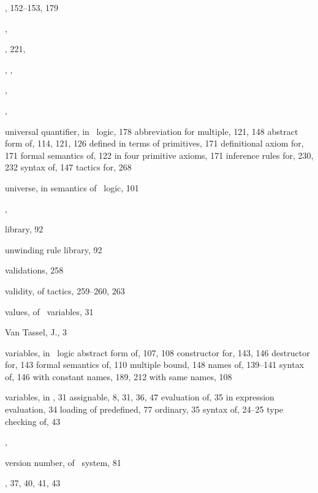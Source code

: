 \begin{theindex}
  \item {}, 152--153, 179
  \item {}, 
  \item {}, 221, 
  \item {}, , 
  \item {}, 
  \item {}, 
  \item universal quantifier, in \HOL\ logic, 178
    \subitem abbreviation for multiple, 121, 148
    \subitem abstract form of, 114, 121, 126
    \subitem defined in terms of primitives, 171
    \subitem definitional axiom for, 171
    \subitem formal semantics of, 122
    \subitem in four primitive axioms, 171
    \subitem inference rules for, 230, 232
    \subitem syntax of, 147
    \subitem tactics for, 268
  \item universe, in semantics of \HOL\ logic, 101
  \item {}, 
  \item {} library, 92
  \item unwinding rule library, 92

  \indexspace

  \item validations, 258
  \item validity, of tactics, 259--260, 263
  \item values, of \ML\ variables, 31
  \item Van Tassel, J., 3
  \item variables, in \HOL\ logic
    \subitem abstract form of, 107, 108
    \subitem constructor for, 143, 146
    \subitem destructor for, 143
    \subitem formal semantics of, 110
    \subitem multiple bound, 148
    \subitem names of, 139--141
    \subitem syntax of, 146
    \subitem with constant names, 189, 212
    \subitem with same names, 108
  \item variables, in \ML, 31
    \subitem assignable, 8, 31, 36, 47
    \subitem evaluation of, 35
    \subitem in expression evaluation, 34
    \subitem loading of predefined, 77
    \subitem ordinary, 35
    \subitem syntax of, 24--25
    \subitem type checking of, 43
  \item {}, 
  \item version number, of \HOL\ system, 81
  \item {}, 37, 40, 41, 43

  \indexspace


\end{theindex}
